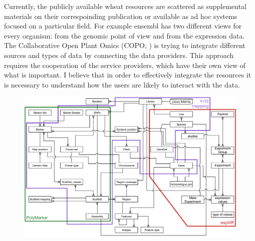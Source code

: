 

Currently, the publicly available wheat resources are scattered as supplemental materials on their correspoinding publication or available as ad hoc systems focused on a particular field.
For example ensembl has two different views for every organism: from the genomic point of view and from the expression data. 
The Collaborative Open Plant Omics (COPO; \citealt{Davey2015}) is trying to integrate different sources and types of data by connecting the data providers. 
This approach requires the cooperation of the service providers, which have their own view of what is important. 
I believe that in order to effectively integrate the resources it is necessary to understand how the users are likely to interact with the data. 

\begin{figure}
\includegraphics[width=1\textwidth]{Conclusions/Figures/CompleteDatabase.pdf}

\end{figure}

